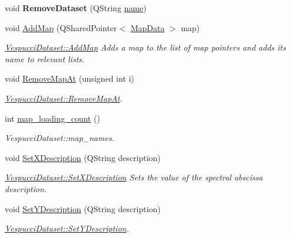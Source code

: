 \begin{DoxyCompactItemize}
\item 
\hypertarget{class_vespucci_dataset_aba2b5b8368d785374e7fb56c93403582}{void {\bfseries Remove\+Dataset} (Q\+String \hyperlink{class_vespucci_dataset_ae5b30cb466acfdf741b360bc4f897cc9}{name})}\label{class_vespucci_dataset_aba2b5b8368d785374e7fb56c93403582}

\item 
void \hyperlink{class_vespucci_dataset_a99e7818506a6a846fce631cf0d996ab0}{Add\+Map} (Q\+Shared\+Pointer$<$ \hyperlink{class_map_data}{Map\+Data} $>$ map)
\begin{DoxyCompactList}\small\item\em \hyperlink{class_vespucci_dataset_a99e7818506a6a846fce631cf0d996ab0}{Vespucci\+Dataset\+::\+Add\+Map} Adds a map to the list of map pointers and adds its name to relevant lists. \end{DoxyCompactList}\item 
void \hyperlink{class_vespucci_dataset_a4524268e2b962f0efa7569e33d5456d1}{Remove\+Map\+At} (unsigned int i)
\begin{DoxyCompactList}\small\item\em \hyperlink{class_vespucci_dataset_a4524268e2b962f0efa7569e33d5456d1}{Vespucci\+Dataset\+::\+Remove\+Map\+At}. \end{DoxyCompactList}\item 
int \hyperlink{class_vespucci_dataset_a5ddd5cfaca0df48cd8ac3976f339a1cc}{map\+\_\+loading\+\_\+count} ()
\begin{DoxyCompactList}\small\item\em Vespucci\+Dataset\+::map\+\_\+names. \end{DoxyCompactList}\item 
void \hyperlink{class_vespucci_dataset_a06f001e1a7c5bc58088498c6c78555d4}{Set\+X\+Description} (Q\+String description)
\begin{DoxyCompactList}\small\item\em \hyperlink{class_vespucci_dataset_a06f001e1a7c5bc58088498c6c78555d4}{Vespucci\+Dataset\+::\+Set\+X\+Description} Sets the value of the spectral abscissa description. \end{DoxyCompactList}\item 
void \hyperlink{class_vespucci_dataset_a1665798dbd73ca4763b5101d29b7d7c3}{Set\+Y\+Description} (Q\+String description)
\begin{DoxyCompactList}\small\item\em \hyperlink{class_vespucci_dataset_a1665798dbd73ca4763b5101d29b7d7c3}{Vespucci\+Dataset\+::\+Set\+Y\+Description}. \end{DoxyCompactList}\item 

\end{DoxyCompactItemize}
